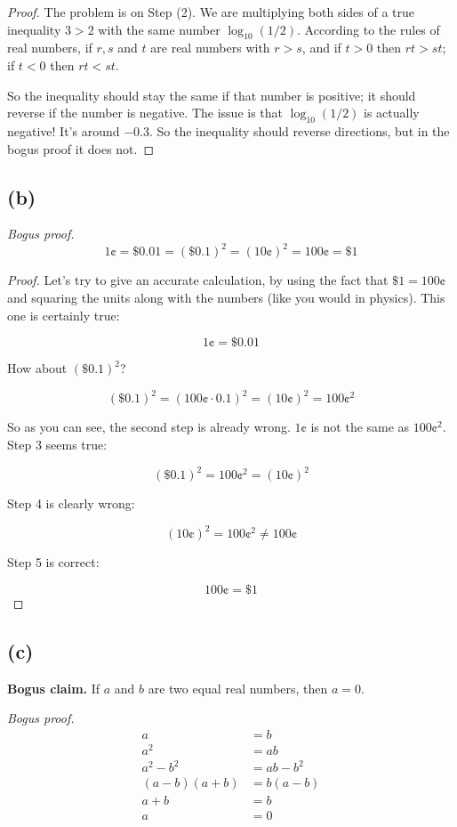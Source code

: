 \documentclass[14pt]{extarticle}
\begin{document}
\begin{proof}
The problem is on Step (2). We are multiplying both sides of a true inequality $3 > 2$ with the same number $\log_{10}(1/2)$. According to the rules of real numbers, if $r, s$ and $t$ are real numbers with $r > s$, and if $t > 0$ then $rt > st$; if $t < 0$ then $rt < st$. 

So the inequality should stay the same if that number is positive; it should reverse if the number is negative. The issue is that $\log_{10}(1/2)$ is actually negative! It's around $-0.3$. So the inequality should reverse directions, but in the bogus proof it does not.
\end{proof}

\subsection{(b)}

{\it Bogus proof.}
$$
1 \cent = \$ 0.01 = (\$ 0.1)^2 = (10\cent)^2 = 100\cent = \$1
$$

\begin{proof}
Let's try to give an accurate calculation, by using the fact that $\$1 = 100\cent$ and squaring the units along with the numbers (like you would in physics). This one is certainly true:

$$
1 \cent = \$ 0.01
$$

How about $(\$ 0.1)^2$?

$$
(\$ 0.1)^2 = (100\cent \cdot 0.1)^2 = (10\cent)^2 = 100\cent^2
$$

So as you can see, the second step is already wrong. $1\cent$ is not the same as $100\cent^2$. 
Step 3 seems true:

$$
(\$ 0.1)^2 = 100\cent^2 = (10\cent)^2
$$

Step 4 is clearly wrong:

$$
(10\cent)^2 = 100\cent^2 \neq 100\cent
$$

Step 5 is correct:

$$
100\cent = \$1
$$
\end{proof}

\subsection{(c)} 

{\bf Bogus claim.} If $a$ and $b$ are two equal real numbers, then $a = 0$.

{\it Bogus proof.}
\begin{align}
a &=b  \\
a^2 &= ab\\
a^2-b^2 &= ab-b^2\\
(a-b)(a+b) &= b(a-b)\\
a+b &= b\\
a &= 0
\end{align}
\end{document}
